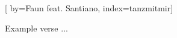 
[%
    by={Faun feat. Santiano},
    index={tanzmitmir}]


    \label{tanzmitmir}

    \beginverse
        Example verse ...
    \endverse
\endsong
